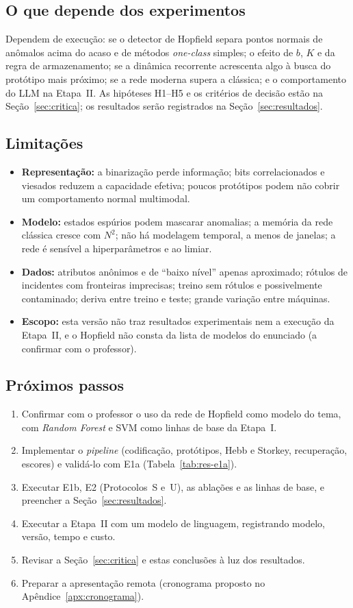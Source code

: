 \subsection{O que depende dos experimentos}
Dependem de execução: se o detector de Hopfield separa pontos normais de anômalos acima do acaso e de métodos
\emph{one-class} simples; o efeito de $b$, $K$ e da regra de armazenamento; se a dinâmica recorrente
acrescenta algo à busca do protótipo mais próximo; se a rede moderna supera a clássica; e o comportamento do LLM
na Etapa~II. As hipóteses H1--H5 e os critérios de decisão estão na Seção~\ref{sec:critica}; os resultados
serão registrados na Seção~\ref{sec:resultados}.

\subsection{Limitações}
\begin{itemize}
  \item \textbf{Representação:} a binarização perde informação; bits correlacionados e viesados reduzem a
        capacidade efetiva; poucos protótipos podem não cobrir um comportamento normal multimodal.
  \item \textbf{Modelo:} estados espúrios podem mascarar anomalias; a memória da rede clássica cresce com
        $N^2$; não há modelagem temporal, a menos de janelas; a rede é sensível a hiperparâmetros e ao limiar.
  \item \textbf{Dados:} atributos anônimos e de ``baixo nível'' apenas aproximado; rótulos de incidentes com
        fronteiras imprecisas; treino sem rótulos e possivelmente contaminado; deriva entre treino e teste;
        grande variação entre máquinas.
  \item \textbf{Escopo:} esta versão não traz resultados experimentais nem a execução da Etapa~II, e o Hopfield
        não consta da lista de modelos do enunciado (a confirmar com o professor).
\end{itemize}

\subsection{Próximos passos}
\begin{enumerate}
  \item Confirmar com o professor o uso da rede de Hopfield como modelo do tema, com \emph{Random Forest} e SVM
        como linhas de base da Etapa~I.
  \item Implementar o \emph{pipeline} (codificação, protótipos, Hebb e Storkey, recuperação, escores) e
        validá-lo com E1a (Tabela~\ref{tab:res-e1a}).
  \item Executar E1b, E2 (Protocolos~S e~U), as ablações e as linhas de base, e preencher a
        Seção~\ref{sec:resultados}.
  \item Executar a Etapa~II com um modelo de linguagem, registrando modelo, versão, tempo e custo.
  \item Revisar a Seção~\ref{sec:critica} e estas conclusões à luz dos resultados.
  \item Preparar a apresentação remota (cronograma proposto no Apêndice~\ref{apx:cronograma}).
\end{enumerate}

